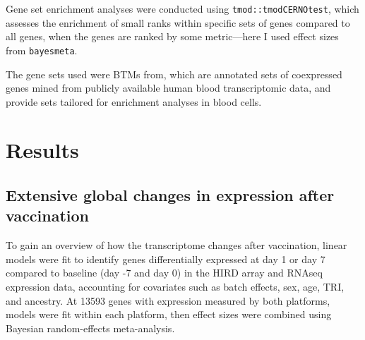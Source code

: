 Gene set enrichment analyses were conducted using \texttt{tmod::tmodCERNOtest}\autocite{weiner3rd2016TmodPackageGeneral}, which assesses the enrichment of small ranks within specific sets of genes compared to all genes, when the genes are ranked by some metric---here I used effect sizes from \texttt{bayesmeta}.
%



The gene sets used were \glspl{BTM} from\autocite{li2013MolecularSignaturesAntibody}, which are annotated sets of coexpressed genes mined from publicly available human blood transcriptomic data, and provide sets tailored for enrichment analyses in blood cells.


\section{Results}

\subsection{Extensive global changes in expression after vaccination}

To gain an overview of how the transcriptome changes after vaccination, linear models were fit to identify genes differentially expressed at day 1 or day 7 compared to baseline (day -7 and day 0) in the \gls{HIRD} array and \gls{RNAseq} expression data, accounting for covariates such as batch effects, sex, age, \gls{TRI}, and ancestry.
At 13593 genes with expression measured by both platforms, models were fit within each platform, then effect sizes were combined using Bayesian random-effects meta-analysis.

